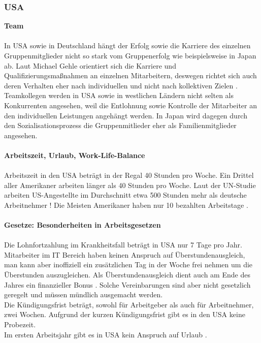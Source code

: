 	\subsubsection{USA}
	\textbf{Team}\\
	\\
	In USA sowie in Deutschland hängt der Erfolg sowie die Karriere des einzelnen Gruppenmitglieder nicht so stark vom Gruppenerfolg wie beispielsweise in Japan ab. Laut Michael Gehle orientiert sich die  Karriere und Qualifizierungsmaßnahmen an einzelnen Mitarbeitern, deswegen richtet sich auch deren Verhalten eher nach individuellen und nicht nach kollektiven Zielen \cite[233]{3LaenderVergl}. 
	Teamkollegen werden in USA sowie in westlichen Ländern nicht selten als Konkurrenten angesehen, weil die Entlohnung sowie Kontrolle der Mitarbeiter an den individuellen Leistungen angehängt werden. In Japan wird dagegen durch den Sozialisationsprozess die Gruppenmitlieder eher als Familienmitglieder angesehen.\\
	 \\
		\textbf{Arbeitszeit, Urlaub, Work-Life-Balance}\\
		\\
	Arbeitszeit in den USA beträgt in der Regal 40 Stunden pro Woche. 
	Ein Drittel aller Amerikaner arbeiten länger als 40 Stunden pro Woche.
	Laut der UN-Studie arbeiten US-Angestellte im Durchschnitt etwa 500 Stunden mehr als deutsche Arbeitnehmer \cite{ArbeitsumgUSA}! Die Meisten Amerikaner haben nur 10 bezahlten Arbeitstage \cite{InfoUSArbVertr}. 
	\\
	\\	\textbf{Gesetze: Besonderheiten in Arbeitsgesetzen}\\
		\\
		Die Lohnfortzahlung im Krankheitsfall beträgt in USA nur 7 Tage pro Jahr. 
		Mitarbeiter im IT Bereich haben keinen Anspruch auf Überstundenausgleich, man kann aber inoffiziell ein zusätzlichen Tag in der Woche frei nehmen um die Überstunden auszugleichen. Als Überstundenausgleich dient auch am Ende des Jahres ein finanzieller Bonus \cite{InfoUSArbVertr}.
		Solche Vereinbarungen sind aber nicht gesetzlich geregelt und müssen mündlich ausgemacht werden.\\
		Die Kündigungsfrist beträgt, sowohl für Arbeitgeber als auch für 
		Arbeitnehmer, zwei Wochen. Aufgrund der kurzen Kündigungsfrist gibt es in den USA keine Probezeit.\\
		Im ersten Arbeitsjahr gibt es in USA kein Anspruch auf Urlaub \cite{USA_Tipps}.
		\\ \\
